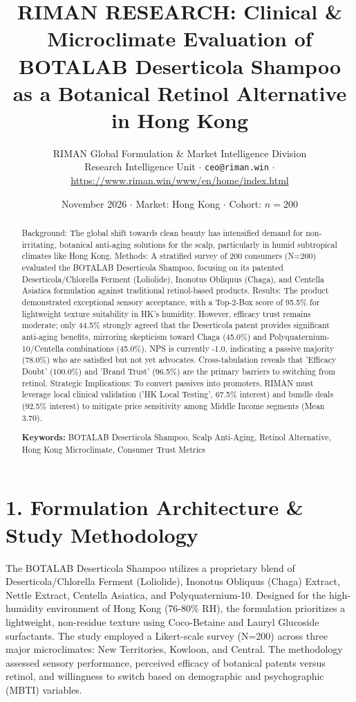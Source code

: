 \documentclass[10pt,twocolumn,a4paper]{article}
\title{\textbf{RIMAN RESEARCH: Clinical \& Microclimate Evaluation of BOTALAB Deserticola Shampoo as a Botanical Retinol Alternative in Hong Kong}}
\author{RIMAN Global Formulation \& Market Intelligence Division\\
\small Research Intelligence Unit $\cdot$ \texttt{ceo@riman.win} $\cdot$ \url{https://www.riman.win/www/en/home/index.html}}
\date{November 2026 \quad $\cdot$ \quad Market: Hong Kong \quad $\cdot$ \quad Cohort: $n = 200$}
\begin{document}
\maketitle

\begin{abstract}
Background: The global shift towards clean beauty has intensified demand for non-irritating, botanical anti-aging solutions for the scalp, particularly in humid subtropical climates like Hong Kong. Methods: A stratified survey of 200 consumers (N=200) evaluated the BOTALAB Deserticola Shampoo, focusing on its patented Deserticola/Chlorella Ferment (Loliolide), Inonotus Obliquus (Chaga), and Centella Asiatica formulation against traditional retinol-based products. Results: The product demonstrated exceptional sensory acceptance, with a Top-2-Box score of 95.5\% for lightweight texture suitability in HK's humidity. However, efficacy trust remains moderate; only 44.5\% strongly agreed that the Deserticola patent provides significant anti-aging benefits, mirroring skepticism toward Chaga (45.0\%) and Polyquaternium-10/Centella combinations (45.0\%). NPS is currently -1.0, indicating a passive majority (78.0\%) who are satisfied but not yet advocates. Cross-tabulation reveals that 'Efficacy Doubt' (100.0\%) and 'Brand Trust' (96.5\%) are the primary barriers to switching from retinol. Strategic Implications: To convert passives into promoters, RIMAN must leverage local clinical validation ('HK Local Testing', 67.5\% interest) and bundle deals (92.5\% interest) to mitigate price sensitivity among Middle Income segments (Mean 3.70).

\vspace{0.4em}
\noindent\textbf{Keywords:} BOTALAB Deserticola Shampoo, Scalp Anti-Aging, Retinol Alternative, Hong Kong Microclimate, Consumer Trust Metrics
\end{abstract}

\section{1. Formulation Architecture \& Study Methodology}
The BOTALAB Deserticola Shampoo utilizes a proprietary blend of Deserticola/Chlorella Ferment (Loliolide), Inonotus Obliquus (Chaga) Extract, Nettle Extract, Centella Asiatica, and Polyquaternium-10. Designed for the high-humidity environment of Hong Kong (76-80\% RH), the formulation prioritizes a lightweight, non-residue texture using Coco-Betaine and Lauryl Glucoside surfactants. The study employed a Likert-scale survey (N=200) across three major microclimates: New Territories, Kowloon, and Central. The methodology assessed sensory performance, perceived efficacy of botanical patents versus retinol, and willingness to switch based on demographic and psychographic (MBTI) variables.
\end{document}
